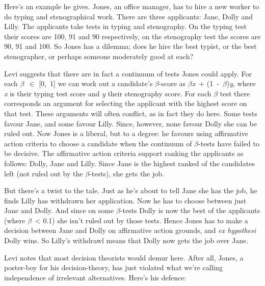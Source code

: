 Here's an example he gives. Jones, an office manager, has to hire a new
worker to do typing and stenographical work. There are three applicants:
Jane, Dolly and Lilly. The applicants take tests in typing and
stenography. On the typing test their scores are 100, 91 and 90
respectively, on the stenography test the scores are 90, 91 and 100. So
Jones has a dilemma; does he hire the best typist, or the best
stenographer, or perhaps someone moderately good at each?

Levi suggests that there are in fact a continuum of tests Jones could
apply. For each $\beta$~$\in$ {[}0,~1{]} we can work out a candidate's $\beta$-score as
$\beta$\emph{x}~+ (1~‑~$\beta$)\emph{y}, where \emph{x} is their typing test score
and \emph{y} their stenography score. For each $\beta$ test there corresponds
an argument for selecting the applicant with the highest score on that
test. These arguments will often conflict, as in fact they do here. Some
tests favour Jane, and some favour Lilly. Since, however, none favour
Dolly she can be ruled out. Now Jones is a liberal, but to a degree: he
favours using affirmative action criteria to choose a candidate when the
continuum of $\beta$-tests have failed to be decisive. The affirmative action
criteria support ranking the applicants as follows: Dolly, Jane and
Lilly. Since Jane is the highest ranked of the candidates left (not
ruled out by the $\beta$-tests), she gets the job.

But there's a twist to the tale. Just as he's about to tell Jane she has
the job, he finds Lilly has withdrawn her application. Now he has to
choose between just Jane and Dolly. And since on some $\beta$-tests Dolly is
now the best of the applicants (where $\beta$~\textless{} 0.1) she isn't ruled
out by those tests. Hence Jones has to make a decision between Jane and
Dolly on affirmative action grounds, and \emph{ex hypothesi} Dolly wins.
So Lilly's withdrawl means that Dolly now gets the job over Jane.

Levi notes that most decision theorists would demur here. After all,
Jones, a poster-boy for his decision-theory, has just violated what
we're calling independence of irrelevant alternatives. Here's his
defence:

